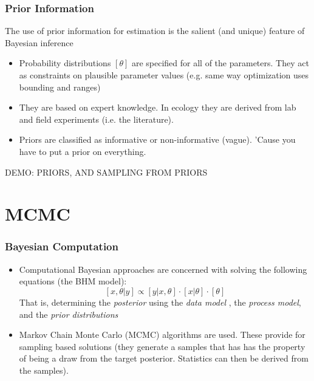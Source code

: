 \documentclass{beamer}
\begin{document}
\frame%
{\frametitle{Prior Information}

The use of prior information for estimation is the salient (and unique) feature of Bayesian inference
\begin{itemize}
\item
Probability distributions $[\theta]$ are specified for all of the parameters. They act as constraints on plausible parameter values (e.g. same way optimization uses bounding and ranges)
\item
They are based on expert knowledge. In ecology they are derived from lab and field experiments (i.e. the literature). 
\item
Priors are classified as informative or non-informative (vague). 'Cause you have to put a prior on everything. 

\end{itemize}

\color{red} DEMO: PRIORS, AND SAMPLING FROM PRIORS

}

\section{MCMC}


\frame%
{\frametitle{Bayesian Computation}

\begin{itemize}
\item
Computational Bayesian approaches are concerned with solving the following equations (the BHM model):
\[
[x,\theta | y] \propto [y | x, \theta] \cdot [x | \theta] \cdot [\theta]
\]
That is, determining the {\it posterior} using the {\it data model} , the {\it process model}, and the {\it prior distributions}
\item
Markov Chain Monte Carlo (MCMC) algorithms are used. These provide for sampling based solutions (they generate a samples that has has the property of being a draw from the target posterior. Statistics can then be derived from the samples).

\end{itemize}

}
\end{document}

